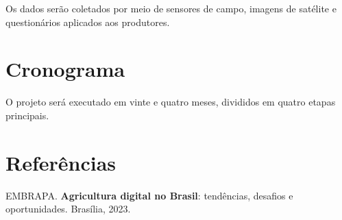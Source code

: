 \documentclass{abnt-projeto-pesquisa}
\begin{document}
Os dados serão coletados por meio de sensores de campo, imagens de
satélite e questionários aplicados aos produtores.

\chapter{Cronograma}

O projeto será executado em vinte e quatro meses, divididos em quatro
etapas principais.

\chapter{Referências}

EMBRAPA. \textbf{Agricultura digital no Brasil}: tendências,
desafios e oportunidades. Brasília, 2023.
\end{document}
